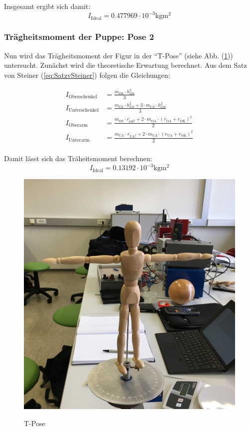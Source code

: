 Insgesamt ergibt sich damit:
\begin{equation*}
  I_{\text{Ideal}} = 0.477969 \cdot 10^{-3} \unit{\kilo\gram\meter\squared}
\end{equation*}

\subsubsection{Trägheitsmoment der Puppe: Pose 2}

Nun wird das Trägheitsmoment der Figur in der \enquote{T-Pose} (siehe Abb. (\ref{fig:pose2})) untersucht.
Zunächst wird die theoretische Erwartung berechnet.
Aus dem Satz von Steiner (\ref{eq:SatzvSteiner}) folgen die Gleichungen:

\begin{align*}
  I_{\text{Oberschenkel}} &= \frac{m_{\text{OS}} \cdot h_{\text{OS}}^2} {3} \\
  I_{\text{Unterschenkel}} &= \frac{m_{\text{US}} \cdot h_{\text{US}}^2 + 3 \cdot m_{US} \cdot h_{OS}^2} {3} \\
  I_{\text{Oberarm}} &= \frac{m_{\text{OS}} \cdot r_{\text{OS}^2} + 2 \cdot m_{\text{OA}} \cdot (r_{\text{OA}} + r_{\text{OK}})^2} {2} \\
  I_{\text{Unterarm}} &= \frac{m_{\text{UA}} \cdot r_{\text{UA}^2} + 2 \cdot m_{\text{UA}} \cdot (r_{\text{UA}} + r_{\text{OK}})^2} {2} \\
\end{align*}

Damit lässt sich das Träheitsmoment berechnen:
\begin{equation*}
  I_{\text{Ideal}} = 0.13192 \cdot 10^{-3} \unit{\kilo\gram\meter\squared}
\end{equation*}

\begin{figure}[H]
  \caption{T-Pose}
  \centering
  \includegraphics[width=0.3\columnwidth]{pictures/puppe_tpose.jpg}
  \label{fig:pose2}
\end{figure}


